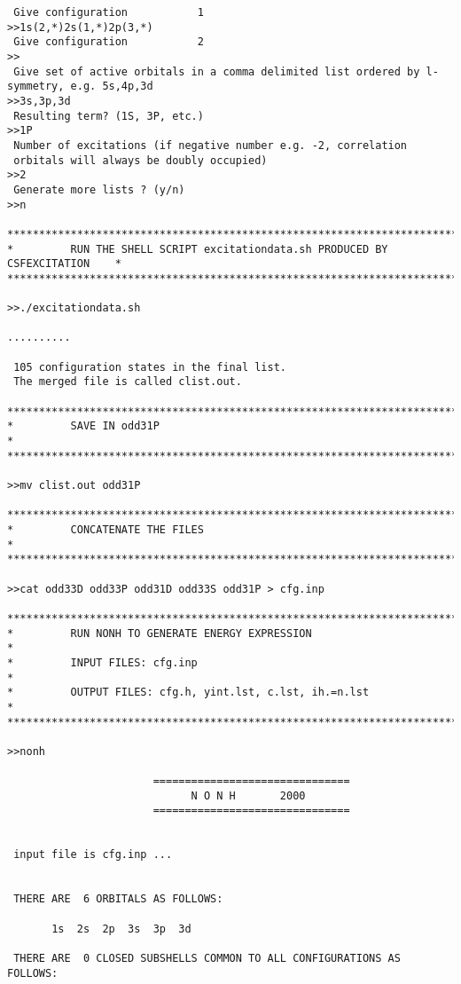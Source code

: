 \documentclass[fleqn,10pt]{book}
\begin{document}
\begin{verbatim}
 Give configuration           1
>>1s(2,*)2s(1,*)2p(3,*)
 Give configuration           2
>>
 Give set of active orbitals in a comma delimited list ordered by l-symmetry, e.g. 5s,4p,3d
>>3s,3p,3d
 Resulting term? (1S, 3P, etc.)
>>1P
 Number of excitations (if negative number e.g. -2, correlation 
 orbitals will always be doubly occupied)                        
>>2
 Generate more lists ? (y/n)
>>n

*******************************************************************************
*         RUN THE SHELL SCRIPT excitationdata.sh PRODUCED BY CSFEXCITATION    *
*******************************************************************************

>>./excitationdata.sh

..........

 105 configuration states in the final list.
 The merged file is called clist.out.

*******************************************************************************
*         SAVE IN odd31P                                                      *
*******************************************************************************

>>mv clist.out odd31P

*******************************************************************************
*         CONCATENATE THE FILES                                               *
*******************************************************************************

>>cat odd33D odd33P odd31D odd33S odd31P > cfg.inp

*******************************************************************************
*         RUN NONH TO GENERATE ENERGY EXPRESSION                              *
*         INPUT FILES: cfg.inp                                                *
*         OUTPUT FILES: cfg.h, yint.lst, c.lst, ih.=n.lst                     *
*******************************************************************************

>>nonh

                       ===============================
                             N O N H       2000
                       ===============================


 input file is cfg.inp ...


 THERE ARE  6 ORBITALS AS FOLLOWS:

       1s  2s  2p  3s  3p  3d

 THERE ARE  0 CLOSED SUBSHELLS COMMON TO ALL CONFIGURATIONS AS FOLLOWS:



\end{verbatim}
\end{document}
